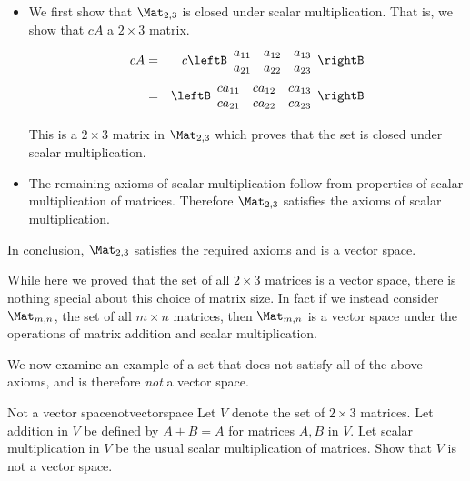 \begin{solution}
\begin{itemize}
\item
We first show that $\Mat_{2,3}$ is closed under scalar multiplication. That is, we show that $cA$ a $2 \times 3$ matrix.
\begin{eqnarray*}
cA &=& c\leftB \begin{array}{rrr}
a_{11} & a_{12} & a_{13}\\
a_{21} & a_{22} & a_{23}
\end{array} \rightB \\
&=& \leftB \begin{array}{rrr}
ca_{11} & ca_{12} & ca_{13}\\
ca_{21} & ca_{22} & ca_{23}
\end{array} \rightB
\end{eqnarray*}

This is a $2 \times 3$ matrix in $\Mat_{2,3}$ which proves that the set is closed under scalar multiplication. 

\item The remaining axioms of scalar multiplication follow from properties of scalar multiplication of matrices. Therefore $\Mat_{2,3}$ satisfies the axioms of scalar multiplication. 
\end{itemize}

In conclusion, $\Mat_{2,3}$ satisfies the required axioms and is a vector space. 
\end{solution}

While here we proved that the set of all $2 \times 3$ matrices is a vector space, there is nothing special about this choice of matrix size. In fact if we instead consider $\Mat_{m,n}$, the set of all $m \times n$ matrices, then  $\Mat_{m,n}$ is a vector space under the operations of matrix addition and scalar multiplication. 

We now examine an example of a set that does not satisfy all of the above axioms, and is therefore \textit{not} a vector space. 

\begin{example}{Not a vector space}{notvectorspace}
Let $V$ denote the set of $2 \times 3$ matrices. Let addition in $V$ be defined by $A + B = A$ for matrices $A,B$ in $V$. Let scalar multiplication in $V$ be the usual scalar multiplication of matrices. Show that $V$ is not a vector space.
\end{example}

